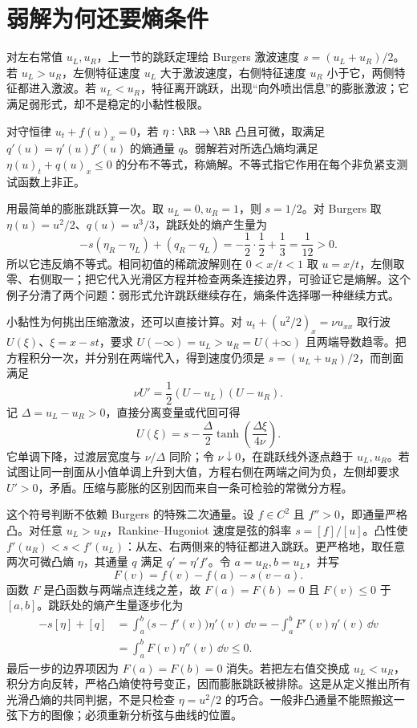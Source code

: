 \section{弱解为何还要熵条件}

对左右常值 \(u_L,u_R\)，上一节的跳跃定理给 Burgers 激波速度 \(s=(u_L+u_R)/2\)。若 \(u_L>u_R\)，左侧特征速度 \(u_L\) 大于激波速度，右侧特征速度 \(u_R\) 小于它，两侧特征都进入激波。若 \(u_L<u_R\)，特征离开跳跃，出现“向外喷出信息”的膨胀激波；它满足弱形式，却不是稳定的小黏性极限。

\begin{definition}[凸熵不等式]
对守恒律 \(u_t+f(u)_x=0\)，若 \(\eta:\RR\to\RR\) 凸且可微，取满足 \(q'(u)=\eta'(u)f'(u)\) 的熵通量 \(q\)。弱解若对所选凸熵均满足 \(\eta(u)_t+q(u)_x\le0\) 的分布不等式，称熵解。不等式指它作用在每个非负紧支测试函数上非正。
\end{definition}

用最简单的膨胀跳跃算一次。取 \(u_L=0,u_R=1\)，则 \(s=1/2\)。对 Burgers 取 \(\eta(u)=u^2/2\)、\(q(u)=u^3/3\)，跳跃处的熵产生量为
\[
-s(\eta_R-\eta_L)+(q_R-q_L)
=-\frac12\cdot\frac12+\frac13=\frac1{12}>0.
\]
所以它违反熵不等式。相同初值的稀疏波解则在 \(0<x/t<1\) 取 \(u=x/t\)，左侧取零、右侧取一；把它代入光滑区方程并检查两条连接边界，可验证它是熵解。这个例子分清了两个问题：弱形式允许跳跃继续存在，熵条件选择哪一种继续方式。

小黏性为何挑出压缩激波，还可以直接计算。对 \(u_t+(u^2/2)_x=\nu u_{xx}\) 取行波 \(U(\xi)\)、\(\xi=x-st\)，要求 \(U(-\infty)=u_L>u_R=U(+\infty)\) 且两端导数趋零。把方程积分一次，并分别在两端代入，得到速度仍须是 \(s=(u_L+u_R)/2\)，而剖面满足
\[
\nu U'=\frac12(U-u_L)(U-u_R).
\]
记 \(\Delta=u_L-u_R>0\)，直接分离变量或代回可得
\[
U(\xi)=s-\frac\Delta2\tanh\!\left(\frac{\Delta\xi}{4\nu}\right).
\]
它单调下降，过渡层宽度与 \(\nu/\Delta\) 同阶；令 \(\nu\downarrow0\)，在跳跃线外逐点趋于 \(u_L,u_R\)。若试图让同一剖面从小值单调上升到大值，方程右侧在两端之间为负，左侧却要求 \(U'>0\)，矛盾。压缩与膨胀的区别因而来自一条可检验的常微分方程。

这个符号判断不依赖 Burgers 的特殊二次通量。设 \(f\in C^2\) 且 \(f''>0\)，即通量严格凸。对任意 \(u_L>u_R\)，Rankine--Hugoniot 速度是弦的斜率 \(s=[f]/[u]\)。凸性使 \(f'(u_R)<s<f'(u_L)\)：从左、右两侧来的特征都进入跳跃。更严格地，取任意两次可微凸熵 \(\eta\)，其通量 \(q\) 满足 \(q'=\eta'f'\)。令 \(a=u_R,b=u_L\)，并写
\[
 F(v)=f(v)-f(a)-s(v-a).
\]
函数 \(F\) 是凸函数与两端点连线之差，故 \(F(a)=F(b)=0\) 且 \(F(v)\le0\) 于 \([a,b]\)。跳跃处的熵产生量逐步化为
\[
 \begin{aligned}
 -s[\eta]+[q]
 &=\int_a^b\bigl(s-f'(v)\bigr)\eta'(v)\,\dd v
 =-\int_a^b F'(v)\eta'(v)\,\dd v\\
 &=\int_a^b F(v)\eta''(v)\,\dd v\le0.
 \end{aligned}
\]
最后一步的边界项因为 \(F(a)=F(b)=0\) 消失。若把左右值交换成 \(u_L<u_R\)，积分方向反转，严格凸熵使符号变正，因而膨胀跳跃被排除。这是从定义推出所有光滑凸熵的共同判据，不是只检查 \(\eta=u^2/2\) 的巧合。一般非凸通量不能照搬这一弦下方的图像；必须重新分析弦与曲线的位置。

